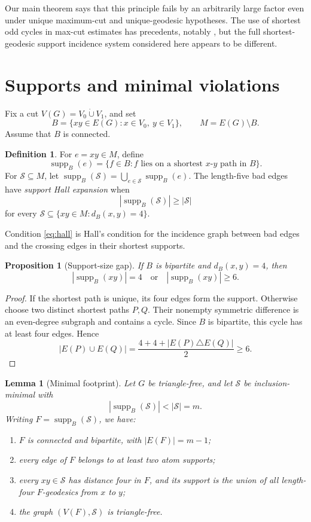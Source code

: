 \documentclass[11pt]{article}
\newtheorem{proposition}[theorem]{Proposition}
\newtheorem{lemma}[theorem]{Lemma}
\theoremstyle{definition}
\newtheorem{definition}[theorem]{Definition}
\newcommand{\supp}{\operatorname{supp}}
\begin{document}
Our main theorem says that this principle fails by an arbitrarily large
factor even under unique maximum-cut and unique-geodesic hypotheses. The
use of shortest odd cycles in max-cut estimates has precedents, notably
\cite{CKL17}, but the full shortest-geodesic support incidence system
considered here appears to be different.

\section{Supports and minimal violations}

Fix a cut \(V(G)=V_0\mathbin{\dot\cup}V_1\), and set
\[
 B=\{xy\in E(G):x\in V_0,\ y\in V_1\},\qquad M=E(G)\setminus B.
\]
Assume that \(B\) is connected.

\begin{definition}
For \(e=xy\in M\), define
\[
 \supp_B(e)=\{f\in B:f\text{ lies on a shortest }x\text{-}y
 \text{ path in }B\}.
\]
For \(\mathcal S\subseteq M\), let
\(\supp_B(\mathcal S)=\bigcup_{e\in\mathcal S}\supp_B(e)\).
The length-five bad edges have \emph{support Hall expansion} when
\[
 |\supp_B(\mathcal S)|\ge|\mathcal S| \tag{2}\label{eq:hall}
\]
for every \(\mathcal S\subseteq\{xy\in M:d_B(x,y)=4\}\).
\end{definition}

Condition \eqref{eq:hall} is Hall's condition for the incidence graph
between bad edges and the crossing edges in their shortest supports.

\begin{proposition}[Support-size gap]\label{prop:gap}
If \(B\) is bipartite and \(d_B(x,y)=4\), then
\[
 |\supp_B(xy)|=4\quad\text{or}\quad|\supp_B(xy)|\ge6.
\]
\end{proposition}

\begin{proof}
If the shortest path is unique, its four edges form the support. Otherwise
choose two distinct shortest paths \(P,Q\). Their nonempty symmetric
difference is an even-degree subgraph and contains a cycle. Since \(B\) is
bipartite, this cycle has at least four edges. Hence
\[
 |E(P)\cup E(Q)|
 =\frac{4+4+|E(P)\triangle E(Q)|}{2}\ge6.
\]
\end{proof}

\begin{lemma}[Minimal footprint]\label{lem:minimal}
Let \(G\) be triangle-free, and let \(\mathcal S\) be inclusion-minimal
with
\[
 |\supp_B(\mathcal S)|<|\mathcal S|=m.
\]
Writing \(F=\supp_B(\mathcal S)\), we have:
\begin{enumerate}[label=\textup{(\roman*)}]
\item \(F\) is connected and bipartite, with \(|E(F)|=m-1\);
\item every edge of \(F\) belongs to at least two atom supports;
\item every \(xy\in\mathcal S\) has distance four in \(F\), and its
support is the union of all length-four \(F\)-geodesics from \(x\) to \(y\);
\item the graph \((V(F),\mathcal S)\) is triangle-free.
\end{enumerate}
\end{lemma}
\end{document}
